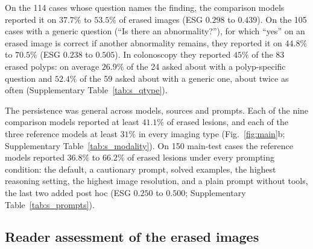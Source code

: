 On the 114 cases whose question names the finding, the comparison models reported it on $37.7\%$ to $53.5\%$ of erased images (ESG $0.298$ to $0.439$).
On the 105 cases with a generic question (``Is there an abnormality?''), for which ``yes'' on an erased image is correct if another abnormality remains, they reported it on $44.8\%$ to $70.5\%$ (ESG $0.238$ to $0.505$).
In colonoscopy they reported $45\%$ of the 83 erased polyps: on average $26.9\%$ of the 24 asked about with a polyp-specific question and $52.4\%$ of the 59 asked about with a generic one, about twice as often (Supplementary Table~\ref{tab:s_qtype}).

The persistence was general across models, sources and prompts.
Each of the nine comparison models reported at least $41.1\%$ of erased lesions, and each of the three reference models at least $31\%$ in every imaging type (Fig.~\ref{fig:main}b; Supplementary Table~\ref{tab:s_modality}).
On 150 main-test cases the reference models reported $36.8\%$ to $66.2\%$ of erased lesions under every prompting condition: the default, a cautionary prompt, solved examples, the highest reasoning setting, the highest image resolution, and a plain prompt without tools, the last two added post hoc (ESG $0.250$ to $0.500$; Supplementary Table~\ref{tab:s_prompts}).

\subsection{Reader assessment of the erased images}\label{subsec:res_readers}

